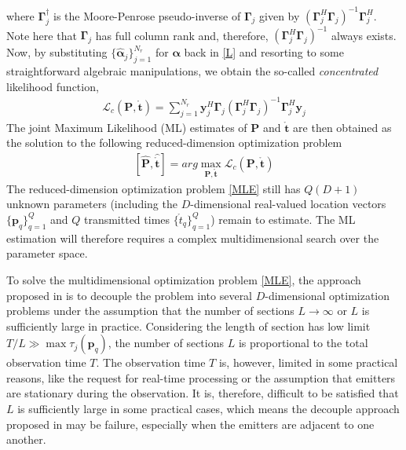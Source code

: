 \documentclass[review]{elsarticle}
\begin{document}
where $\boldsymbol{\Gamma}_{j}^\dagger$ is the Moore-Penrose pseudo-inverse of $\boldsymbol{\Gamma}_{j}$ given by $(\boldsymbol{\Gamma}_{j}^H\boldsymbol{\Gamma}_{j})^{-1}\boldsymbol{\Gamma}_{j}^H$. Note here that $\boldsymbol{\Gamma}_{j}$ has full column rank and, therefore, $(\boldsymbol{\Gamma}_{j}^H\boldsymbol{\Gamma}_{j})^{-1}$ always exists. Now, by substituting $\lbrace \hat{\boldsymbol{\alpha}}_j\rbrace _{j=1}^{N_r}$ for $\boldsymbol{\alpha}$ back in \eqref{L} and resorting to some straightforward algebraic manipulations, we obtain the so-called \emph{concentrated} likelihood function,
\begin{align}\label{CLF}
    \mathcal{L}_c(\boldsymbol{P},\mathring{\boldsymbol{t}})=\sum_{j=1}^{N_r}\boldsymbol{y}_j^H\boldsymbol{\Gamma}_{j}(\boldsymbol{\Gamma}_{j}^H\boldsymbol{\Gamma}_{j})^{-1}\boldsymbol{\Gamma}_{j}^H\boldsymbol{y}_j
\end{align}
The joint Maximum Likelihood (ML) estimates of $\boldsymbol{P}$ and $\mathring{\boldsymbol{t}}$ are then obtained as the solution to the following reduced-dimension optimization problem
\begin{align}\label{MLE}
    [\hat{\boldsymbol{P}},\hat{\mathring{\boldsymbol{t}}}]=arg \max_{\boldsymbol{P},\mathring{\boldsymbol{t}}} \mathcal{L}_c(\boldsymbol{P},\mathring{\boldsymbol{t}})
\end{align}
The reduced-dimension optimization problem \eqref{MLE} still has $Q(D+1)$ unknown parameters (including the $D$-dimensional real-valued location vectors $\lbrace \boldsymbol{p}_q\rbrace_{q=1}^Q$ and $Q$ transmitted times $\lbrace \mathring{t}_q\rbrace_{q=1}^Q$) remain to estimate. The ML estimation will therefore requires a complex multidimensional search over the parameter space.

To solve the multidimensional optimization problem \eqref{MLE}, the approach proposed in \cite{DPD2005} is to decouple the problem into several $D$-dimensional optimization problems under the assumption that the number of sections $L\to \infty$ or $L$ is sufficiently large in practice. Considering the length of section has low limit $T/L\gg \max{\tau_j(\boldsymbol{p}_q)}$, the number of sections $L$ is proportional to the total observation time $T$. The observation time $T$ is, however, limited in some practical reasons, like the request for real-time processing or the assumption that emitters are stationary during the observation. It is, therefore, difficult to be satisfied that $L$ is sufficiently large in some practical cases, which means the decouple approach proposed in \cite{DPD2005} may be failure, especially when the emitters are adjacent to one another.
\end{document}
